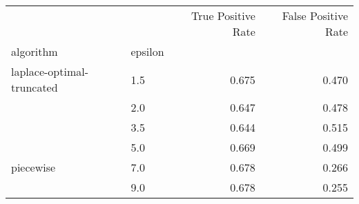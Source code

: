 \begin{tabular}{llrr}
\toprule
          &     &  True Positive Rate &  False Positive Rate \\
algorithm & epsilon &                     &                      \\
\midrule
laplace-optimal-truncated & 1.5 &               0.675 &                0.470 \\
          & 2.0 &               0.647 &                0.478 \\
          & 3.5 &               0.644 &                0.515 \\
          & 5.0 &               0.669 &                0.499 \\
piecewise & 7.0 &               0.678 &                0.266 \\
          & 9.0 &               0.678 &                0.255 \\
\bottomrule
\end{tabular}
